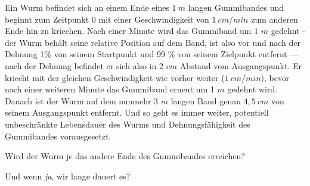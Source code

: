 
Ein Wurm befindet sich an einem Ende eines $1~m$ langen Gummibandes
und beginnt zum Zeitpunkt 0 mit einer Geschwindigkeit von $1~cm/min$
zum anderen Ende hin zu kriechen. Nach einer Minute wird das Gummiband
um 1 $m$ gedehnt - der Wurm behält seine relative Position
auf dem Band, ist also vor und nach der Dehnung 1\% von
seinem Startpunkt und 99 \% von seinem Zielpunkt entfernt --- nach der
Dehnung befindet er sich also in 2 $cm$ Abstand vom Ausgangspunkt.
Er kriecht mit der gleichen Geschwindigkeit wie vorher weiter ($1~cm/min$),
bevor nach einer weiteren Minute das Gummiband erneut um 1 $m$ gedehnt wird.
Danach ist der Wurm auf dem nunmehr 3 $m$ langen Band genau $4,5~cm$ von
seinem Ausgangspunkt entfernt. Und so geht es immer weiter, potentiell
unbeschränkte Lebensdauer des Wurms und Dehnungsfähigkeit des
Gummibandes vorausgesetzt.

\begin{flushenum}
\item
Wird der Wurm je das andere Ende des Gummibandes erreichen?
\item
Und wenn {\it ja}, wir lange dauert es?
\end{flushenum}



